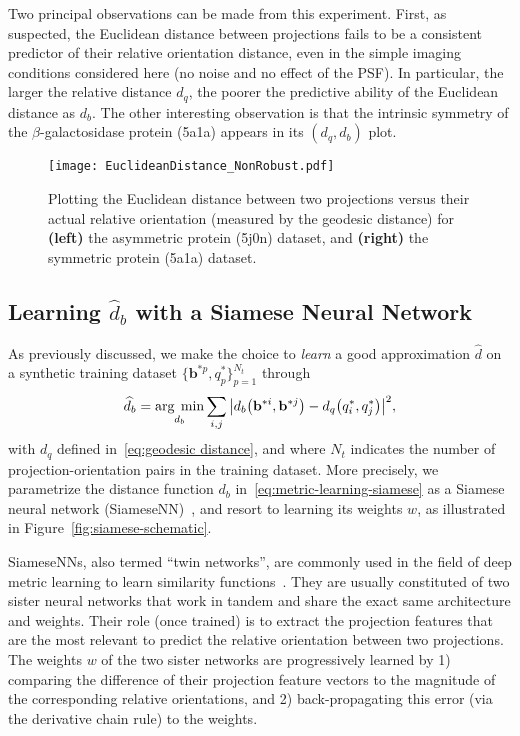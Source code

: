 Two principal observations can be made from this experiment. First, as suspected, the Euclidean distance between projections fails to be a consistent predictor of their relative orientation distance, even in the simple imaging conditions considered here (no noise and no effect of the PSF). In particular, the larger the relative distance $d_q$, the poorer the predictive ability of the Euclidean distance as $d_b$. The other interesting observation is that the intrinsic symmetry of the $\beta$-galactosidase protein (5a1a) appears in its $(d_q,d_b)$ plot.

\begin{figure}[t]
    \centering
    \texttt{[image: EuclideanDistance\_NonRobust.pdf]}
    \caption{Plotting the Euclidean distance between two projections versus their actual relative orientation (measured by the geodesic distance) for \textbf{(left)} the asymmetric protein (5j0n) dataset, and \textbf{(right)} the symmetric protein (5a1a) dataset. }
    \label{fig:euclidean-not-robust}
\end{figure}

\subsection{Learning $\widehat{d}_b$ with a Siamese Neural Network}

As previously discussed, we make the choice to \textit{learn} a good approximation $\widehat{d}$ on a synthetic training dataset $\big\{ \mathbf{b}^{*p}, q^*_p\big\}_{p=1}^{N_t}$ through
\begin{equation}
    \label{eq:metric-learning-siamese}
    \widehat{d}_b=\underset{d_b}{\arg\;\min}\sum_{i,j} \big|d_b\big(\mathbf{b}^{*i},\mathbf{b}^{*j}\big) - d_q\big(q^*_i,q^*_j\big) \big|^2,
\end{equation}
with $d_q$ defined in~\eqref{eq:geodesic distance}, and where $N_t$ indicates the number of projection-orientation pairs in the training dataset. More precisely, we parametrize the distance function $d_b$ in~\eqref{eq:metric-learning-siamese} as a Siamese neural network (SiameseNN)~\cite{chopra2005learning}, and resort to learning its weights $w$, as illustrated in Figure~\ref{fig:siamese-schematic}.

SiameseNNs, also termed ``twin networks'', are commonly used in the field of deep metric learning to learn similarity functions~\cite{yi2014deep}. They are usually constituted of two sister neural networks that work in tandem and share the exact same architecture and weights.  Their role (once trained) is to extract the projection features that are the most relevant to predict the relative orientation between two projections. The weights $w$ of the two sister networks are progressively learned by 1) comparing the difference of their projection feature vectors to the magnitude of the corresponding relative orientations, and 2) back-propagating this error (via the derivative chain rule) to the weights.

